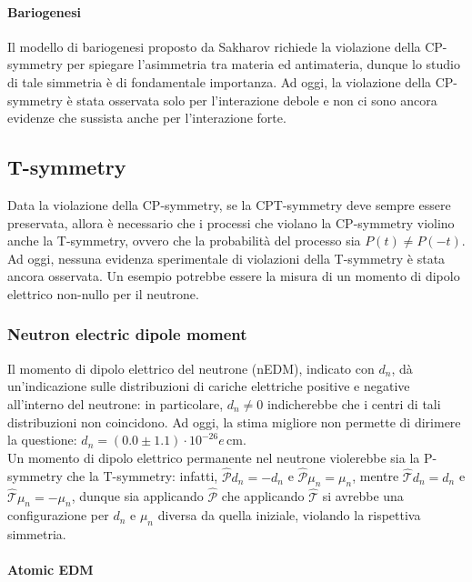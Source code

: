 \paragraph{Bariogenesi}

Il modello di bariogenesi proposto da Sakharov richiede la violazione della CP-symmetry per spiegare l'asimmetria tra materia ed antimateria, dunque lo studio di tale simmetria è di fondamentale importanza. Ad oggi, la violazione della CP-symmetry è stata osservata solo per l'interazione debole e non ci sono ancora evidenze che sussista anche per l'interazione forte.

\subsection{T-symmetry}

Data la violazione della CP-symmetry, se la CPT-symmetry deve sempre essere preservata, allora è necessario che i processi che violano la CP-symmetry violino anche la T-symmetry, ovvero che la probabilità del processo sia $ P(t) \neq P(-t) $.\\
Ad oggi, nessuna evidenza sperimentale di violazioni della T-symmetry è stata ancora osservata. Un esempio potrebbe essere la misura di un momento di dipolo elettrico non-nullo per il neutrone.

\subsubsection{Neutron electric dipole moment}

Il momento di dipolo elettrico del neutrone (nEDM), indicato con $ d_n $, dà un'indicazione sulle distribuzioni di cariche elettriche positive e negative all'interno del neutrone: in particolare, $ d_n \neq 0 $  indicherebbe che i centri di tali distribuzioni non coincidono. Ad oggi, la stima migliore non permette di dirimere la questione: $ d_n = (0.0 \pm 1.1) \cdot 10^{-26} e \, \text{cm} $.\\
Un momento di dipolo elettrico permanente nel neutrone violerebbe sia la P-symmetry che la T-symmetry: infatti, $ \hat{\mathcal{P}} d_n = - d_n $ e $ \hat{\mathcal{P}} \mu_n = \mu_n $, mentre $ \hat{\mathcal{T}} d_n = d_n $ e $ \hat{\mathcal{T}} \mu_n = - \mu_n $, dunque sia applicando $ \hat{\mathcal{P}} $ che applicando $ \hat{\mathcal{T}} $ si avrebbe una configurazione per $ d_n $ e $ \mu_n $ diversa da quella iniziale, violando la rispettiva simmetria.

\paragraph{Atomic EDM}

